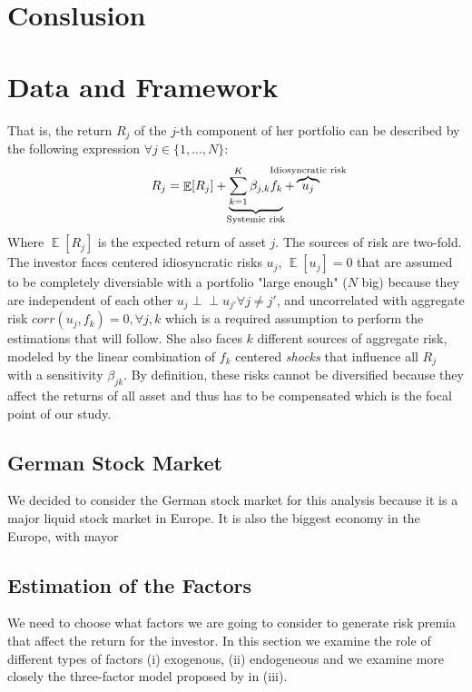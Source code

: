 \documentclass[hidelinks,11pts]{article}
\DeclareMathOperator{\E}{\mathbb{E}}
\DeclareMathOperator{\1}{\mathbbm{1}}
\newcommand{\ind}{\perp\!\!\!\!\perp}
\begin{document}
\section*{Conslusion}


\newpage
\newpage 
\section{Data and Framework}


That is, the return $R_j$ of the $j$-th component of her portfolio can be described by the following expression $\forall j\in \{1,...,N\}$: 
    \begin{equation} \label{eq:factorialmodel}
        R_j = \E[R_j] + \underbrace{\sum_{k=1}^K \beta_{j,k} f_k}_{\mathclap{\text{Systemic risk}}} + \overbrace{u_j}^{\mathclap{\text{Idiosyncratic risk}}}
    \end{equation}
Where $\E[R_j]$ is the expected return of asset $j$. 
The sources of risk are two-fold. 
The investor faces centered idiosyncratic risks $u_j$, $\E[u_j]=0$ that are assumed to be completely diversiable with a portfolio "large enough" ($N$ big) because they are independent of each other $u_j \ind u_{j'} \forall j\neq j' $, and uncorrelated with aggregate risk $corr(u_j, f_k) = 0, \forall j, k$ which is a required assumption to perform the estimations that will follow.
She also faces $k$ different sources of aggregate risk, modeled by the linear combination of $f_k$ centered \emph{shocks} that influence all $R_j$ with a sensitivity $\beta_{jk}$. 
By definition, these risks cannot be diversified because they affect the returns of all asset and thus has to be compensated which is the focal point of our study. 



    \subsection{German Stock Market}
We decided to consider the German stock market for this analysis because it is a major liquid stock market in Europe. It is also the biggest economy in the Europe, with mayor 





    \subsection{Estimation of the Factors}

We need to choose what factors we are going to consider to generate risk premia that affect the return for the investor. In this section we examine the role of different types of factors (i) exogenous, (ii) endogeneous and we examine more closely the three-factor model proposed by \cite{famaCommonRiskFactors1993} in (iii).
\end{document}
